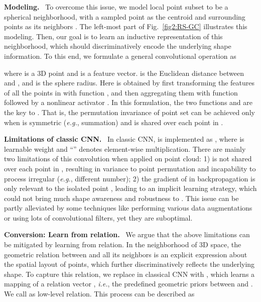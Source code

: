 \documentclass[10pt,twocolumn,letterpaper]{article}
\begin{document}
\vspace{6pt}
\noindent\textbf{Modeling.}\,\,~To overcome this issue, we model local point subset  to be a spherical neighborhood, with a sampled point  as the centroid and surrounding points as its neighbors . The left-most part of Fig.~\ref{fig2:RS-GC} illustrates this modeling. Then, our goal is to learn an inductive representation  of this neighborhood, which should discriminatively encode the underlying shape information. To this end, we formulate a general convolutional operation as

where  is a 3D point and  is a feature vector.  is the Euclidean distance between  and , and  is the sphere radius. Here  is obtained by first transforming the features of all the points in  with function , and then aggregating them with function  followed by a nonlinear activator . In this formulation, the two functions  and  are the key to . That is, the permutation invariance of point set can be achieved only when  is symmetric (\textit{e.g.}, summation) and  is shared over each point in .

\vspace{6pt}
\noindent\textbf{Limitations of classic CNN.}\,\,~In classic CNN,  is implemented as , where  is learnable weight and ``'' denotes element-wise multiplication. There are mainly two limitations of this convolution when applied on point cloud: 1)  is not shared over each point in , resulting in variance to point permutation and incapability to process irregular  (\textit{e.g.}, different number); 2) the gradient of  in backpropagation is only relevant to the isolated point , leading to an implicit learning strategy, which could not bring much shape awareness and robustness to . This issue can be partly alleviated by some techniques like performing various data augmentations or using lots of convolutional filters, yet they are suboptimal.

\vspace{6pt}
\noindent\textbf{Conversion: Learn from relation.}\,\,~We argue that the above limitations can be mitigated by learning from relation. In the neighborhood of 3D space, the geometric relation between  and all its neighbors  is an explicit expression about the spatial layout of points, which further discriminatively reflects the underlying shape. To capture this relation, we replace  in classical CNN with , which learns a mapping  of a relation vector , \textit{i.e.}, the predefined geometric priors between  and . We call  as low-level relation. This process can be described as
\end{document}
